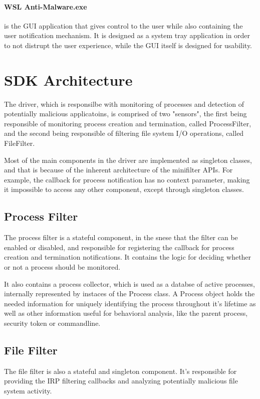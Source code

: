        \paragraph{WSL Anti-Malware.exe}
        is the GUI application that gives control to the user while also containing the user notification mechanism. It is designed as a system
        tray application in order to not distrupt the user experience, while the GUI itself is designed for usability.

    \section{SDK Architecture}
        The driver, which is responsilbe with monitoring of processes and detection of potentially malicious applicatoins, is comprised of
        two "sensors", the first being responsible of monitoring process creation and termination, called ProcessFilter, and the second being
        responsible of filtering file system I/O operations, called FileFilter.

        Most of the main components in the driver are implemented as singleton classes, and that is because of the inherent architecture of
        the minifilter APIs. For example, the callback for process notification has no context parameter, making it impossible to access
        any other component, except through singleton classes.

        \subsection{Process Filter}
        The process filter is a stateful component, in the snese that the filter can be enabled or disabled, and responsible for registering
        the callback for process creation and termination notifications. It contains the logic for deciding whether or not a process should be
        monitored.

        It also contains a process collector, which is used as a databse of active processes, internally represented by instaces of the Process
        class. A Process object holds the needed information for uniquely identifying the process throughout it's lifetime as well as other
        information useful for behavioral analysis, like the parent process, security token or commandline.

        \subsection{File Filter}
        The file filter is also a stateful and singleton component. It's responsible for providing the IRP filtering callbacks and analyzing
        potentially malicious file system activity.

